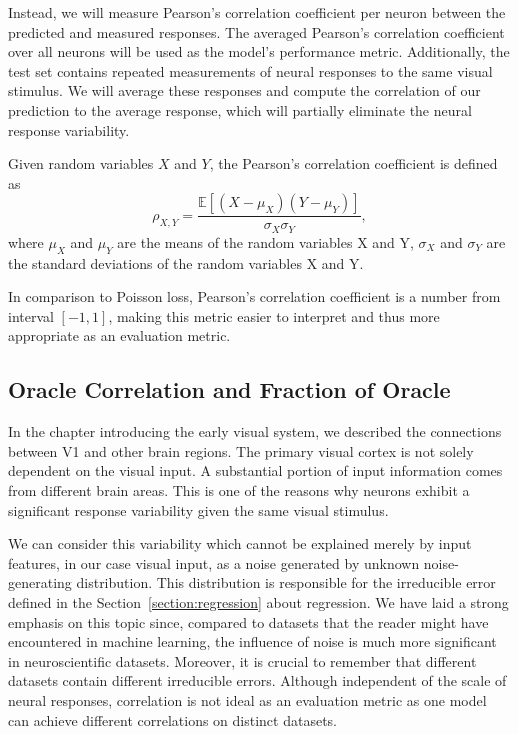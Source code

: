 Instead, we will measure Pearson’s correlation coefficient per neuron between the predicted and measured responses. The averaged Pearson’s correlation coefficient over all neurons will be used as the model’s performance metric. Additionally, the test set contains repeated measurements of neural responses to the same visual stimulus. We will average these responses and compute the correlation of our prediction to the average response, which will partially eliminate the neural response variability.

\begin{defn}\label{def01:9}
	Given random variables $X$ and $Y$, the Pearson's correlation coefficient is defined as
	\begin{equation}
		\rho_{X, Y} = \frac{\mathbb{E}\left[(X - \mu_X)(Y - \mu_Y)\right]}{\sigma_X \sigma_Y},
	\end{equation}
	where $\mu_X$ and $\mu_Y$ are the means of the random variables X and Y, $\sigma_X$ and $\sigma_Y$ are the standard deviations of the random variables X and Y.
\end{defn}


In comparison to Poisson loss, Pearson’s correlation coefficient is a number from interval $[-1, 1]$, making this metric easier to interpret and thus more appropriate as an evaluation metric.

\subsection{Oracle Correlation and Fraction of Oracle}

In the chapter introducing the early visual system, we described the connections between V1 and other brain regions. The primary visual cortex is not solely dependent on the visual input. A substantial portion of input information comes from different brain areas. This is one of the reasons why neurons exhibit a significant response variability given the same visual stimulus.

We can consider this variability which cannot be explained merely by input features, in our case visual input, as a noise generated by unknown noise-generating distribution. This distribution is responsible for the irreducible error defined in the Section~\ref{section:regression} about regression. We have laid a strong emphasis on this topic since, compared to datasets that the reader might have encountered in machine learning, the influence of noise is much more significant in neuroscientific datasets. Moreover, it is crucial to remember that different datasets contain different irreducible errors. Although independent of the scale of neural responses, correlation is not ideal as an evaluation metric as one model can achieve different correlations on distinct datasets.

